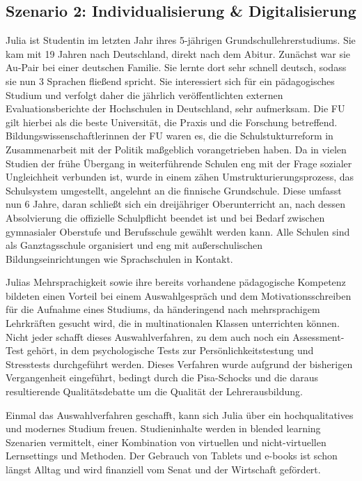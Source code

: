 \documentclass[12pt,a4paper]{article}
\begin{document}
\begin{appendix}
\section{Szenario 2: Individualisierung \& Digitalisierung}
Julia ist Studentin im letzten Jahr ihres 5-jährigen Grundschullehrerstudiums. Sie kam mit 19 Jahren nach Deutschland, direkt nach dem Abitur. Zunächst war sie Au-Pair bei einer deutschen Familie. Sie lernte dort sehr schnell deutsch, sodass sie nun 3 Sprachen fließend spricht. Sie interessiert sich für ein pädagogisches Studium und verfolgt daher die jährlich veröffentlichten externen Evaluationsberichte der Hochschulen in Deutschland, sehr aufmerksam. Die FU gilt hierbei als die beste Universität, die Praxis und die Forschung betreffend. Bildungswissenschaftlerinnen der FU waren es, die die Schulstukturreform in Zusammenarbeit mit der Politik maßgeblich vorangetrieben haben. Da in vielen Studien der frühe Übergang in weiterführende Schulen eng mit der Frage sozialer Ungleichheit verbunden ist, wurde in einem zähen Umstrukturierungsprozess, das Schulsystem umgestellt, angelehnt an die finnische Grundschule. Diese umfasst nun 6 Jahre, daran schließt sich ein dreijähriger Oberunterricht an, nach dessen Absolvierung die offizielle Schulpflicht beendet ist und bei Bedarf zwischen gymnasialer Oberstufe und Berufsschule gewählt werden kann. Alle Schulen sind als Ganztagsschule organisiert und eng mit außerschulischen Bildungseinrichtungen wie Sprachschulen in Kontakt.

Julias Mehrsprachigkeit sowie ihre bereits vorhandene pädagogische Kompetenz bildeten einen Vorteil bei einem Auswahlgespräch und dem Motivationsschreiben für die Aufnahme eines Studiums, da händeringend nach mehrsprachigem Lehrkräften gesucht wird, die in multinationalen Klassen unterrichten können. Nicht jeder schafft dieses Auswahlverfahren, zu dem auch noch ein Assessment-Test gehört, in dem psychologische Tests zur Per\-sönlich\-keits\-testung und Stresstests durchgeführt werden. Dieses Verfahren wurde aufgrund der bisherigen Vergangenheit eingeführt, bedingt durch die Pisa-Schocks und die daraus resultierende Qualitätsdebatte um die Qualität der Lehrerausbildung.

Einmal das Auswahlverfahren geschafft, kann sich Julia über ein hochqualitatives und modernes Studium freuen.
Studieninhalte werden in blended learning Szenarien vermittelt, einer Kombination von virtuellen und nicht-virtuellen Lernsettings und Methoden. Der Gebrauch von Tablets und e-books ist schon längst Alltag und wird finanziell vom Senat und der Wirtschaft gefördert.


\end{appendix}
\end{document}

